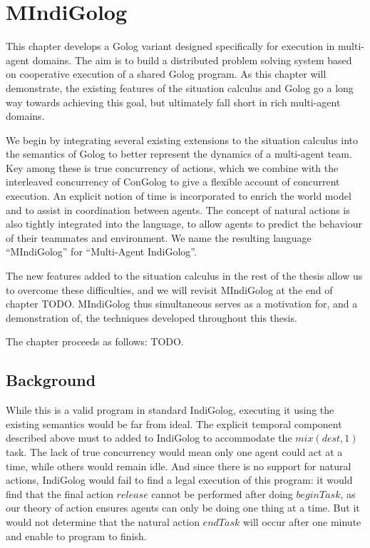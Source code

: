 

\chapter{MIndiGolog}

\label{ch:mindigolog}

This chapter develops a Golog variant designed specifically for execution
in multi-agent domains. The aim is to build a distributed problem
solving system based on cooperative execution of a shared Golog program.
As this chapter will demonstrate, the existing features of the situation
calculus and Golog go a long way towards achieving this goal, but
ultimately fall short in rich multi-agent domains.

We begin by integrating several existing extensions to the situation
calculus into the semantics of Golog to better represent the dynamics
of a multi-agent team. Key among these is true concurrency of actions,
which we combine with the interleaved concurrency of ConGolog to give
a flexible account of concurrent execution. An explicit notion of
time is incorporated to enrich the world model and to assist in coordination
between agents. The concept of natural actions is also tightly integrated
into the language, to allow agents to predict the behaviour of their
teammates and environment. We name the resulting language {}``MIndiGolog''
for {}``Multi-Agent IndiGolog''.

The new features added to the situation calculus in the rest of the
thesis allow us to overcome these difficulties, and we will revisit
MIndiGolog at the end of chapter TODO. MIndiGolog thus simultaneous
serves as a motivation for, and a demonstration of, the techniques
developed throughout this thesis.

The chapter proceeds as follows: TODO.


\section{Background}

While this is a valid program in standard IndiGolog, executing it
using the existing semantics would be far from ideal. The explicit
temporal component described above must to added to IndiGolog to accommodate
the $mix(dest,1)$ task. The lack of true concurrency would mean only
one agent could act at a time, while others would remain idle. And
since there is no support for natural actions, IndiGolog would fail
to find a legal execution of this program: it would find that the
final action $release$ cannot be performed after doing $beginTask$,
as our theory of action ensures agents can only be doing one thing
at a time. But it would not determine that the natural action $endTask$
will occur after one minute and enable to program to finish.

